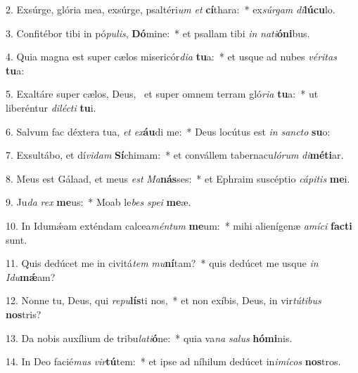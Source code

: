 2. Exsúrge, glória mea, exsúrge, psaltéri\textit{um} \textit{et} \textbf{cí}thara:~*  ex\textit{súr}\textit{gam} \textit{di}\textbf{lú}\textbf{cu}lo.\

3. Confitébor tibi in pó\textit{pu}\textit{lis}, \textbf{Dó}mine:~*  et psallam tibi \textit{in} \textit{na}\textit{ti}\textbf{ó}\textbf{ni}bus.\

4. Quia magna est super cælos misericór\textit{di}\textit{a} \textbf{tu}a:~*  et usque ad nubes \textit{vé}\textit{ri}\textit{tas} \textbf{tu}a:\

5. Exaltáre super cælos, Deus, \dag\  et super omnem terram gló\textit{ri}\textit{a} \textbf{tu}a:~*  ut liberéntur \textit{di}\textit{léc}\textit{ti} \textbf{tu}i.\

6. Salvum fac déxtera tua, \textit{et} \textit{ex}\textbf{áu}di me:~*  Deus locútus est \textit{in} \textit{sanc}\textit{to} \textbf{su}o:\

7. Exsultábo, et dí\textit{vi}\textit{dam} \textbf{Sí}chimam:~*  et convállem tabernacu\textit{ló}\textit{rum} \textit{di}\textbf{mé}\textbf{ti}ar.\

8. Meus est Gálaad, et meus \textit{est} \textit{Ma}\textbf{nás}ses:~*  et Ephraim suscéptio \textit{cá}\textit{pi}\textit{tis} \textbf{me}i.\

9. Ju\textit{da} \textit{rex} \textbf{me}us:~*  Moab le\textit{bes} \textit{spe}\textit{i} \textbf{me}æ.\

10. In Idumǽam exténdam calcea\textit{mén}\textit{tum} \textbf{me}um:~*  mihi alienígenæ \textit{a}\textit{mí}\textit{ci} \textbf{fac}\textbf{ti} sunt.\

11. Quis dedúcet me in civitá\textit{tem} \textit{mu}\textbf{ní}tam?~*  quis dedúcet me usque \textit{in} \textit{I}\textit{du}\textbf{mǽ}am?\

12. Nonne tu, Deus, qui \textit{re}\textit{pu}\textbf{lís}ti nos,~*  et non exíbis, Deus, in vir\textit{tú}\textit{ti}\textit{bus} \textbf{nos}tris?\

13. Da nobis auxílium de tribu\textit{la}\textit{ti}\textbf{ó}ne:~*  quia va\textit{na} \textit{sa}\textit{lus} \textbf{hó}\textbf{mi}nis.\

14. In Deo facié\textit{mus} \textit{vir}\textbf{tú}tem:~*  et ipse ad níhilum dedúcet in\textit{i}\textit{mí}\textit{cos} \textbf{nos}tros.\

